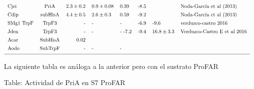 \documentclass[12pt,twoside]{reedthesis}
\begin{document}
\[{\begin{tabular}{ l c r l l l l l}
  Cjei        &PriA   &$  2.3 \pm 0.2 $&$0.9 \pm 0.08   $&0.39                    &-8.5       &          &Noda-García et al (2013)\\ [1ex]
  Cdip        &subHisA&$  4.4 \pm 0.5 $&$2.6 \pm 0.3      $&0.59                  &-9.2       &          &Noda-García et al (2013)\\ [1ex]
  SMg1 TrpF   &TrpF3  &   -                &-                &-                       &-6.9     &-9.6      &verduzco-castro 2016\\ [1ex]
  Jden        &TrpF3  &   -                &-                &-          -7.2         &-9.4     &$16.8\pm3.3$&    Verduzco-Castro E et al  2016\\ [1ex]
  Acar      &SubHisA& 0.02                     &                 &                        &       &          &            \\ [1ex]
  Aodo        &SubTrpF&       -              &-                  &-                     &       &          &\\ [1ex]
  \hline
  \end{tabular}}
  \label{tab:PriAPRA}  
  \]
  
  \clearpage   La siguiente tabla es análoga a la anterior pero con el
  sustrato ProFAR
  
  Table: Actividad de PriA en S7 ProFAR \label{tab:PriAProFAR}
  
\end{document}
